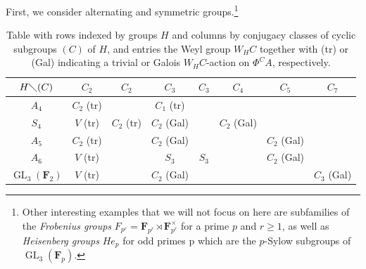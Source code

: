 \documentclass[11pt, a4paper]{article}
\DeclareMathOperator{\GL}{GL}
\newcommand{\1}{\mathbf{1}}
\DeclareMathOperator{\Perf}{Perf}
\newcommand{\F}{\mathbf{F}}
\theoremstyle{plain}
\theoremstyle{definition}
\theoremstyle{remark}\numberwithin{equation}{section}
\newtheorem{remark}[equation]{Remark}
\begin{document}

First, we consider alternating and symmetric groups.\footnote{Other interesting examples that we will not focus on here are subfamilies of the \emph{Frobenius groups} $F_{p^r} = \F_{p^r} \rtimes \F_{p^r}^\times$ for a prime $p$ and $r\geq 1$, as well as \emph{Heisenberg groups} $He_p$ for odd primes p which are the $p$-Sylow subgroups of $\GL_3(\F_p)$.}

\begin{table}
\begin{center}\begin{tabular}{|c|c|c|c|c|c|c|c|}
\hline
$H \diagdown (C)$   & $C_2$         & $C_2$         & $C_3$         & $C_3$ & $C_4$         & $C_5$         & $C_7$         \\ \hline
$A_4$               & $C_2$ (tr)    &               & $C_1$ (tr)    &       &               &               &               \\ 
$S_4$               & $V$ (tr)      & $C_2$ (tr)    & $C_2$ (Gal)   &       & $C_2$ (Gal)   &               &               \\ 
$A_5$               & $C_2$ (tr)    &               & $C_2$ (Gal)   &       &               & $C_2$ (Gal)   &               \\ 
$A_6$               & $V$ (tr)      &               & $S_3$         & $S_3$ &               & $C_2$ (Gal)   &               \\ 
$\GL_3(\F_2)$       & $V$ (tr)      &               & $C_2$ (Gal)   &       &               &               & $C_3$ (Gal)   \\ \hline
\end{tabular}\end{center}
\caption{Table with rows indexed by groups $H$ and columns by conjugacy classes of cyclic subgroups $(C)$ of $H$, and entries the Weyl group $W_H C$ together with (tr) or (Gal) indicating a trivial or Galois $W_H C$-action on $\Phi^C A$, respectively.}
\label{table:1}
\end{table}
\end{document}
